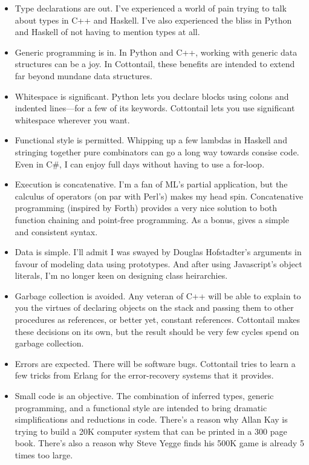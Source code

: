 \begin{itemize}

\item Type declarations are out. I've experienced a world of pain
trying to talk about types in C++ and Haskell. I've also experienced
the bliss in Python and Haskell of not having to mention types at all.

\item Generic programming is in. In Python and C++, working with
generic data structures can be a joy. In Cottontail, these benefits
are intended to extend far beyond mundane data structures.

\item Whitespace is significant. Python lets you declare blocks using
colons and indented lines---for a few of its keywords. Cottontail lets
you use significant whitespace wherever you want.

\item Functional style is permitted. Whipping up a few lambdas in
Haskell and stringing together pure combinators can go a long way
towards consise code. Even in C\#, I can enjoy full days without
having to use a for-loop.

\item Execution is concatenative. I'm a fan of ML's partial
application, but the calculus of operators (on par with Perl's) makes
my head spin. Concatenative programming (inspired by Forth) provides a
very nice solution to both function chaining and point-free
programming. As a bonus, gives a simple and consistent syntax.

\item Data is simple. I'll admit I was swayed by Douglas Hofstadter's
arguments in favour of modeling data using prototypes. And after using
Javascript's object literals, I'm no longer keen on designing class
heirarchies.

\item Garbage collection is avoided. Any veteran of C++ will be able
to explain to you the virtues of declaring objects on the stack and
passing them to other procedures as references, or better yet,
constant references. Cottontail makes these decisions on its own, but
the result should be very few cycles spend on garbage collection.

\item Errors are expected. There will be software bugs. Cottontail
tries to learn a few tricks from Erlang for the error-recovery
systems that it provides.

\item Small code is an objective. The combination of inferred types,
generic programming, and a functional style are intended to bring
dramatic simplifications and reductions in code. There's a reason why
Allan Kay is trying to build a 20K computer system that can be
printed in a 300 page book. There's also a reason why Steve Yegge
\cite{500K} finds his 500K game is already 5 times too large.


\end{itemize}
